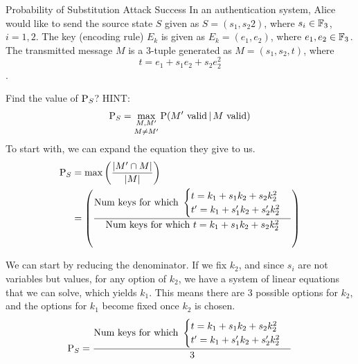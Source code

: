 \begin{example}{Probability of Substitution Attack Success}
  In an authentication system, Alice would like to send the source state $S$ given as $S = (s_{1}, s_{2}2)$, where $s_{i} \in \mathbb{F}_{3^{}}$, $i = 1, 2$.
  The key (encoding rule) $E_{k}$ is given as $E_{k} = (e_{1}, e_{2})$, where $e_{1}, e_{2} \in \mathbb{F}_{3^{}}$.
  The transmitted message $M$ is a 3-tuple generated as $M = (s_{1}, s_{2}, t)$, where
  \begin{equation*}
    t = e_{1} + s_{1}e_{2} + s_{2}e_{2}^{2}
  \end{equation*}.

  Find the value of $\operatorname{\operatorname{P}}_{S}$?
  HINT:\@
  \begin{equation*}
    \operatorname{\operatorname{P}}_{S} = \underset{M \neq M'}{\max_{M, M'}} \operatorname{\operatorname{P}}(M' \text{ valid} \operatorname{\vert} M \text{ valid})
  \end{equation*}
  \tcblower{}
  To start with, we can expand the equation they give to us.
  \begin{equation*}
    \begin{aligned}
      \operatorname{\operatorname{P}}_{S} &= \max \left( \frac{\lvert M' \cap M \rvert}{\lvert M \rvert} \right) \\
      &= \left( \frac{\text{Num keys for which }
          \begin{cases}
            t = k_{1} + s_{1}k_{2} + s_{2}k_{2}^{2} \\
            t' = k_{1} + s'_{1}k_{2} + s'_{2}k_{2}^{2}
          \end{cases}}
        {\text{Num keys for which }t = k_{1} + s_{1}k_{2} + s_{2}k_{2}^{2}}\right)
    \end{aligned}
  \end{equation*}

  We can start by reducing the denominator.
  If we fix $k_{2}$, and since $s_{i}$ are not variables but values, for any option of $k_{2}$, we have a system of linear equations that we can solve, which yields $k_{1}$.
  This means there are 3 possible options for $k_{2}$, and the options for $k_{1}$ become fixed once $k_{2}$ is chosen.
  \begin{equation*}
    \operatorname{\operatorname{P}}_{S} = \frac{\text{Num keys for which }
      \begin{cases}
        t = k_{1} + s_{1}k_{2} + s_{2}k_{2}^{2} \\
        t' = k_{1} + s'_{1}k_{2} + s'_{2}k_{2}^{2}
      \end{cases}}{3}
  \end{equation*}


\end{example}
